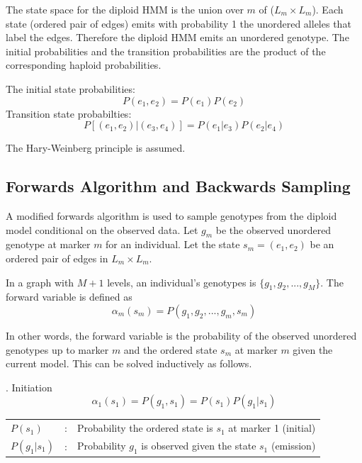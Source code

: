 \documentclass[a4paper,11pt,twoside,abstraction,titlepage]{article}
\begin{document}
\noindent The state space for the diploid HMM is the union over $m$ of ($L_m \times L_m$).  Each state (ordered pair of edges) emits with probability 1 the unordered alleles that label the edges.  Therefore the diploid HMM emits an unordered genotype.  The initial probabilities and the transition probabilities are the product of the corresponding haploid probabilities.

\vspace{10pt}
\noindent The initial state probabilities:
\begin{equation*}
P(e_1,e_2) = P(e_1)P(e_2)
\end{equation*}
Transition state probabilties:
\begin{equation*}
P[(e_1,e_2)|(e_3,e_4)] = P(e_1|e_3)P(e_2|e_4)
\end{equation*}

\noindent The Hary-Weinberg principle is assumed. \cite{beagle2}

\newpage
\subsection{Forwards Algorithm and Backwards Sampling}
A modified forwards algorithm is used to sample genotypes from the diploid model conditional on the observed data.  Let $g_m$ be the observed unordered genotype at marker $m$ for an individual.  Let the state $s_m = (e_1, e_2)$ be an ordered pair of edges in $L_m \times L_m$.

In a graph with $M+1$ levels, an individual's genotypes is $\{g_1, g_2, ... , g_M\}$.  The forward variable is defined as 
\begin{equation*}
\alpha_m(s_m) = P(g_1,g_2,...,g_m,s_m)
\end{equation*}

\noindent In other words, the forward variable is the probability of the observed unordered genotypes up to marker $m$ and the ordered state $s_m$ at marker $m$ given the current model.  This can be solved inductively as follows.

\vspace{10pt}
. Initiation
\begin{equation*}
\alpha_1(s_1) = P(g_1, s_1) = P(s_1) P(g_1|s_1)
\end{equation*}

\begin{framed}
\begin{tabular}{lll}
\hspace{-20pt} $P(s_1)$ & : & \hspace{-5pt}Probability the ordered state is $s_1$ at marker 1 (initial)\\
\hspace{-20pt} $P(g_1|s_1)$ & :& \hspace{-5pt}Probability $g_1$ is observed given the state $s_1$ (emission)
\end{tabular}
\end{framed}
\end{document}
